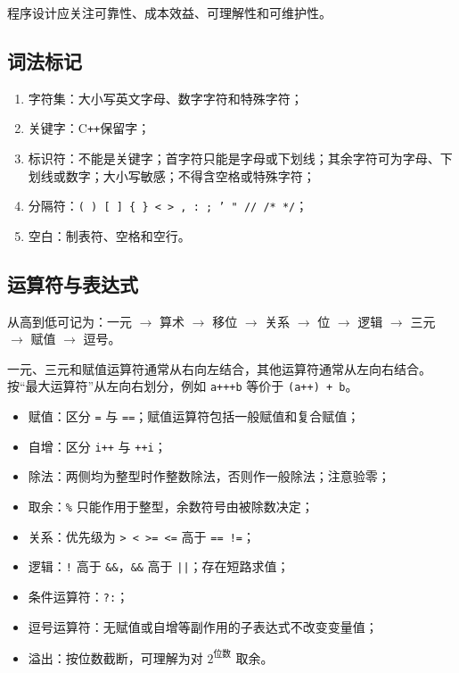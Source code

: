 \documentclass[UTF8,fontset=fandol,zihao=5]{ctexart}
\newcommand{\code}[1]{\texttt{#1}}
\newcommand{\cpp}{C\texttt{++}}
\begin{document}
程序设计应关注可靠性、成本效益、可理解性和可维护性。

\subsection{词法标记}

\begin{enumerate}
  \item 字符集：大小写英文字母、数字字符和特殊字符；
  \item 关键字：\cpp 保留字；
  \item 标识符：不能是关键字；首字符只能是字母或下划线；其余字符可为字母、下划线或数字；大小写敏感；不得含空格或特殊字符；
  \item 分隔符：\code{( ) [ ] \{ \} < > , : ; ' " // /* */}；
  \item 空白：制表符、空格和空行。
\end{enumerate}

\subsection{运算符与表达式}

\begin{method}[运算符优先级]
从高到低可记为：一元 $\to$ 算术 $\to$ 移位 $\to$ 关系 $\to$ 位 $\to$ 逻辑 $\to$ 三元 $\to$ 赋值 $\to$ 逗号。

一元、三元和赋值运算符通常从右向左结合，其他运算符通常从左向右结合。按“最大运算符”从左向右划分，例如 \code{a+++b} 等价于 \code{(a++) + b}。
\end{method}

\begin{itemize}
  \item 赋值：区分 \code{=} 与 \code{==}；赋值运算符包括一般赋值和复合赋值；
  \item 自增：区分 \code{i++} 与 \code{++i}；
  \item 除法：两侧均为整型时作整数除法，否则作一般除法；注意验零；
  \item 取余：\code{\%} 只能作用于整型，余数符号由被除数决定；
  \item 关系：优先级为 \code{> < >= <=} 高于 \code{== !=}；
  \item 逻辑：\code{!} 高于 \code{\&\&}，\code{\&\&} 高于 \code{||}；存在短路求值；
  \item 条件运算符：\code{?:}；
  \item 逗号运算符：无赋值或自增等副作用的子表达式不改变变量值；
  \item 溢出：按位数截断，可理解为对 $2^{\text{位数}}$ 取余。
\end{itemize}
\end{document}
